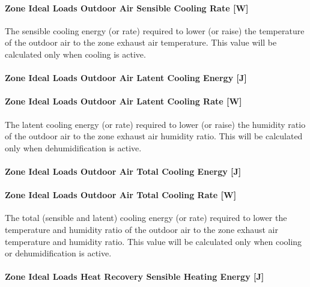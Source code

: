 \paragraph{Zone Ideal Loads Outdoor Air Sensible Cooling Rate {[}W{]}}\label{zone-ideal-loads-outdoor-air-sensible-cooling-rate-w}

The sensible cooling energy (or rate) required to lower (or raise) the temperature of the outdoor air to the zone exhaust air temperature. This value will be calculated only when cooling is active.

\paragraph{Zone Ideal Loads Outdoor Air Latent Cooling Energy {[}J{]}}\label{zone-ideal-loads-outdoor-air-latent-cooling-energy-j}

\paragraph{Zone Ideal Loads Outdoor Air Latent Cooling Rate {[}W{]}}\label{zone-ideal-loads-outdoor-air-latent-cooling-rate-w}

The latent cooling energy (or rate) required to lower (or raise) the humidity ratio of the outdoor air to the zone exhaust air humidity ratio. This will be calculated only when dehumidification is active.

\paragraph{Zone Ideal Loads Outdoor Air Total Cooling Energy {[}J{]}}\label{zone-ideal-loads-outdoor-air-total-cooling-energy-j}

\paragraph{Zone Ideal Loads Outdoor Air Total Cooling Rate {[}W{]}}\label{zone-ideal-loads-outdoor-air-total-cooling-rate-w}

The total (sensible and latent) cooling energy (or rate) required to lower the temperature and humidity ratio of the outdoor air to the zone exhaust air temperature and humidity ratio. This value will be calculated only when cooling or dehumidification is active.

\paragraph{Zone Ideal Loads Heat Recovery Sensible Heating Energy {[}J{]}}\label{zone-ideal-loads-heat-recovery-sensible-heating-energy-j}

